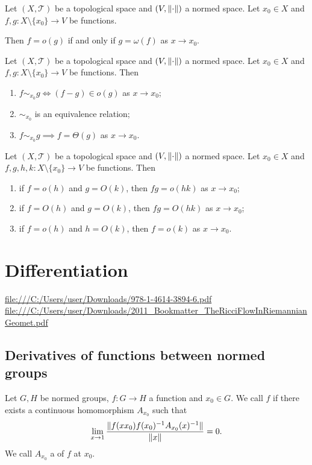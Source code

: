 \begin{lemma}
Let $(X,\mathcal{T})$ be a topological space and $(V,\lVert\cdot\rVert)$ a normed space. Let $x_0 \in X$ and $f,g: X\setminus\{x_0\}\to V$ be functions.

Then $f = o(g)$ \textup{if and only if} $g = \omega(f)$ as $x\to x_0$.
\end{lemma}

\begin{lemma}
Let $(X,\mathcal{T})$ be a topological space and $(V,\lVert\cdot\rVert)$ a normed space. Let $x_0 \in X$ and $f,g: X\setminus\{x_0\}\to V$ be functions. Then
\begin{enumerate}
\item $f\sim_{x_0} g \iff (f-g)\in o(g)$ as $x\to x_0$;
\item $\sim_{x_0}$ is an equivalence relation;
\item $f \sim_{x_0} g \implies f = \Theta(g)$ as $x\to x_0$.
\end{enumerate}
\end{lemma}

\begin{lemma}
Let $(X,\mathcal{T})$ be a topological space and $(V,\lVert\cdot\rVert)$ a normed space. Let $x_0 \in X$ and $f,g, h,k: X\setminus\{x_0\}\to V$ be functions. Then
\begin{enumerate}
\item if $f = o(h)$ and $g = O(k)$, then $fg = o(hk)$ as $x\to x_0$;
\item if $f = O(h)$ and $g = O(k)$, then $fg = O(hk)$ as $x\to x_0$;
\item if $f = o(h)$ and $h = O(k)$, then $f = o(k)$ as $x\to x_0$.
\end{enumerate}
\end{lemma}

\chapter{Differentiation}
\url{file:///C:/Users/user/Downloads/978-1-4614-3894-6.pdf}
\url{file:///C:/Users/user/Downloads/2011_Bookmatter_TheRicciFlowInRiemannianGeomet.pdf}

\section{Derivatives of functions between normed groups}
\begin{definition}
Let $G, H$ be normed groups, $f:G\to H$ a function and $x_0\in G$. We call $f$  if there exists a continuous homomorphism $A_{x_0}$ such that
\[ \lim_{x\to 1}\frac{\lVert f(xx_0)f(x_0)^{-1}A_{x_0}(x)^{-1}\rVert}{\lVert x\rVert} = 0. \]
We call $A_{x_0}$ a  of $f$ at $x_0$.
\end{definition}


